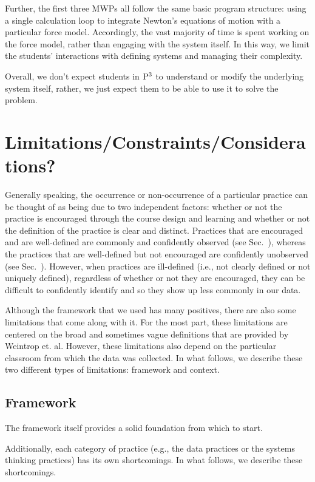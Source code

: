 \documentclass{msuphddissertation}
\begin{document}
\begin{doublespace}
Further, the first three MWPs all follow the same basic program structure: using a single calculation loop to integrate Newton's equations of motion with a particular force model.  Accordingly, the vast majority of time is spent working on the force model, rather than engaging with the system itself.  In this way, we limit the students' interactions with defining systems and managing their complexity.

Overall, we don't expect students in ${\rm P}^{3}$ to understand or modify the underlying system itself, rather, we just expect them to be able to use it to solve the problem.

\section{Limitations/Constraints/Considerations?}

Generally speaking, the occurrence or non-occurrence of a particular practice can be thought of as being due to two independent factors: whether or not the practice is encouraged through the course design and learning and whether or not the definition of the practice is clear and distinct.  Practices that are encouraged and are well-defined are commonly and confidently observed (see Sec.~), whereas the practices that are well-defined but not encouraged are confidently unobserved (see Sec.~).  However, when practices are ill-defined (i.e., not clearly defined or not uniquely defined), regardless of whether or not they are encouraged, they can be difficult to confidently identify and so they show up less commonly in our data.

Although the framework that we used has many positives, there are also some limitations that come along with it.  For the most part, these limitations are centered on the broad and sometimes vague definitions that are provided by Weintrop et. al.  However, these limitations also depend on the particular classroom from which the data was collected.  In what follows, we describe these two different types of limitations: framework and context.

\subsection{Framework}

The framework itself provides a solid foundation from which to start.

Additionally, each category of practice (e.g., the data practices or the systems thinking practices) has its own shortcomings.  In what follows, we describe these shortcomings.


\end{doublespace}
\end{document}
